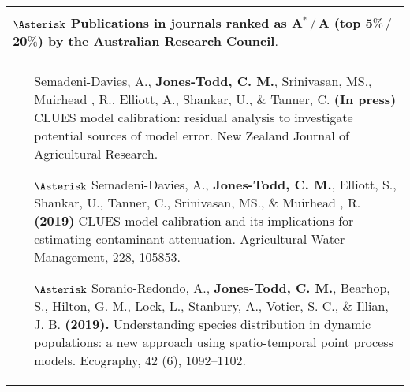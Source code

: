 \documentclass[12pt, a4paper]{article}
\begin{document}
\begin{center}\begin{longtable}{|p{16.3 cm}|}
\hline \cellcolor[gray]{0.8}{\bf 2a.  Research publications and dissemination}  \\
{\bf $\Asterisk$ Publications in journals ranked as A${}^\ast\,/\,$A (top 5$\%\,/\,$20$\%$) by the Australian Research Council}.\\
\hline \cellcolor[gray]{0.8}{Peer reviewed journal articles}  \\
\hline
\begin{itemize}
\item[] Semadeni-Davies, A., \textbf{Jones-Todd, C. M.}, Srinivasan, MS.,  Muirhead , R.,  Elliott, A., Shankar, U., \& Tanner, C. \textbf{(In press)} CLUES model calibration: residual analysis to investigate potential sources of model error. New Zealand Journal of Agricultural Research.
\item[$\Asterisk$] Semadeni-Davies, A., {\bf Jones-Todd, C. M.},  Elliott, S., Shankar, U., Tanner, C., Srinivasan, MS., \& Muirhead , R. {\bf(2019)} CLUES model calibration and its implications for estimating contaminant attenuation. Agricultural Water Management, 228, 105853.
\item[$\Asterisk$] Soranio-Redondo, A., {\bf Jones-Todd, C. M.}, Bearhop, S., Hilton, G. M., Lock, L., Stanbury, A., Votier, S. C., \& Illian, J. B. {\bf (2019).} Understanding species distribution in dynamic populations: a new approach using spatio-temporal point process models. Ecography, 42 (6), 1092--1102.

\end{itemize}
\end{longtable}
\end{center}
\end{document}
